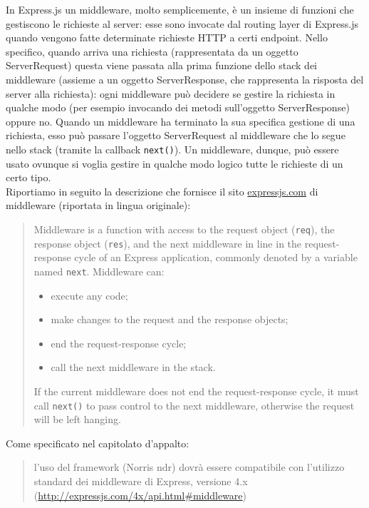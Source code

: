  \label{app:express}
		In Express.js un middleware, molto semplicemente, è un insieme di funzioni che gestiscono le richieste al server: esse sono invocate dal routing layer di Express.js quando vengono fatte determinate richieste HTTP a certi endpoint. Nello specifico, quando arriva una richiesta (rappresentata da un oggetto ServerRequest) questa viene passata alla prima funzione dello stack dei middleware (assieme a un oggetto ServerResponse, che rappresenta la risposta del server alla richiesta): ogni middleware può decidere se gestire la richiesta in qualche modo (per esempio invocando dei metodi sull'oggetto ServerResponse) oppure no. Quando un middleware ha terminato la sua specifica gestione di una richiesta, esso può passare l'oggetto ServerRequest al middleware che lo segue nello stack (tramite la callback \texttt{next()}). Un middleware, dunque, può essere usato ovunque si voglia gestire in qualche modo logico tutte le richieste di un certo tipo.\\
		Riportiamo in seguito la descrizione che fornisce il sito \url{expressjs.com} di middleware (riportata in lingua originale):
		\begin{quote}
			Middleware is a function with access to the request object (\texttt{req}), the response object (\texttt{res}), and the next middleware in line in the request-response cycle of an Express application, commonly denoted by a variable named \texttt{next}. Middleware can:
			\begin{itemize}
				\item execute any code;
				\item make changes to the request and the response objects;
				\item end the request-response cycle;
				\item call the next middleware in the stack.
			\end{itemize}
			If the current middleware does not end the request-response cycle, it must call \texttt{next()} to pass control to the next middleware, otherwise the request will be left hanging.
		\end{quote}
		Come specificato nel capitolato d'appalto:
		\begin{quote}
			l'uso del framework (Norris ndr) dovrà essere compatibile con l’utilizzo standard dei middleware di Express, versione 4.x (\url{http://expressjs.com/4x/api.html#middleware})
		\end{quote}
